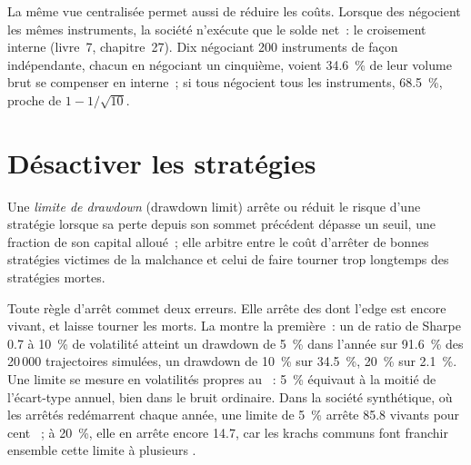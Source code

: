 La même vue centralisée permet aussi de réduire les coûts. Lorsque des  négocient les mêmes instruments, la société n'exécute que le solde net~: le croisement interne (livre~7, chapitre~27). Dix
 négociant 200 instruments de façon indépendante, chacun en négociant un cinquième, voient 34.6~\% de leur volume brut se compenser en interne~; si tous négocient tous
les instruments, 68.5~\%, proche de $1 - 1/\sqrt{10}$.

\section{Désactiver les stratégies}

\begin{definition}\label{def:s1:running-a-multi-strategy-book:limit}
Une \emph{limite de drawdown} (drawdown limit) arrête ou réduit le risque d'une stratégie lorsque sa perte depuis son sommet précédent dépasse un seuil, une fraction de son
capital alloué~; elle arbitre entre le coût d'arrêter de bonnes stratégies victimes de la malchance et celui de faire tourner trop longtemps des stratégies mortes.
\end{definition}

Toute règle d'arrêt commet deux erreurs. Elle arrête des  dont l'edge est encore vivant, et laisse tourner les  morts. La  montre
la première~: un  de ratio de Sharpe 0.7 à 10~\% de volatilité atteint un drawdown de 5~\% dans l'année sur 91.6~\% des 20\,000 trajectoires simulées, un drawdown de 10~\% sur
34.5~\%, 20~\% sur 2.1~\%. Une limite se mesure en volatilités propres au ~: 5~\% équivaut à la moitié de l'écart-type annuel, bien dans le bruit ordinaire. Dans la
société synthétique, où les  arrêtés redémarrent chaque année, une limite de 5~\% arrête 85.8  vivants pour cent ~; à 20~\%, elle en arrête encore 14.7,
car les krachs communs font franchir ensemble cette limite à plusieurs .

